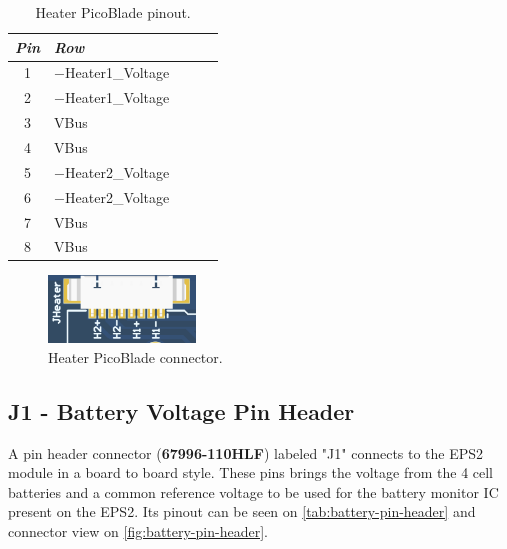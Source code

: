 \begin{table}[!h]
    \centering
    \begin{tabular}{cllll}
        \toprule[1.5pt]
        \textit{Pin} & \textit{Row} \\
        \midrule
        1            & $-$Heater1\_Voltage  \\
        2            & $-$Heater1\_Voltage  \\
        3            & VBus                 \\
        4            & VBus                 \\
        5            & $-$Heater2\_Voltage  \\
        6            & $-$Heater2\_Voltage  \\
        7            & VBus                 \\
        8            & VBus                 \\
        \bottomrule[1.5pt]
    \end{tabular}
    \caption{Heater PicoBlade pinout.}
    \label{tab:heater-picoblade}
\end{table}

\begin{figure}[!ht]
    \begin{center}
        \includegraphics[width=0.35\textwidth]{figures/heater-picoblade.png}
        \caption{Heater PicoBlade connector.}
        \label{fig:heater-picoblade}
    \end{center}
\end{figure}

\subsection{J1 - Battery Voltage Pin Header}

A pin header connector (\textbf{67996-110HLF}) labeled "J1" connects to the EPS2 module in a board to board style. These pins brings the voltage from the 4 cell batteries and a common reference voltage to be used for the battery monitor IC present on the EPS2. Its pinout can be seen on \autoref{tab:battery-pin-header} and connector view on \autoref{fig:battery-pin-header}.

